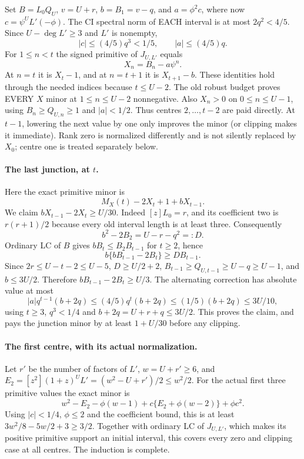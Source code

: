 Set $B=L_0Q_U$, $v=U+r$, $b=B_1=v-q$, and
$a=\phi^2c$, where now $c=\psi^UL'(-\phi)$.
The CI spectral norm of EACH interval is at most $2q^2<4/5$.
Since $U-\deg L'\ge3$ and $L'$ is nonempty,
\[
 |c|\le(4/5)q^3<1/5,\qquad |a|\le(4/5)q.
\]
For $1\le n<t$ the signed primitive of $J_{U,L'}$ equals
\[
 X_n=B_n-a\psi^n.
\]
At $n=t$ it is $X_t-1$, and at $n=t+1$ it is $X_{t+1}-b$.
These identities hold through the needed indices because $t\le U-2$.
The old robust budget proves EVERY $X$ minor at
$1\le n\le U-2$ nonnegative. Also $X_n>0$ on $0\le n\le U-1$,
using $B_n\ge Q_{U,n}\ge1$ and $|a|<1/2$.
Thus centres $2,\ldots,t-2$ are paid directly. At $t-1$, lowering
the next value by one only improves the minor (or clipping makes
it immediate). Rank zero is normalized differently and is not
silently replaced by $X_0$; centre one is treated separately below.

\paragraph{The last junction, at $t$.}
Here the exact primitive minor is
\[
 M_X(t)-2X_t+1+bX_{t-1}.
\]
We claim $bX_{t-1}-2X_t\ge U/30$.
Indeed $[z]L_0=r$, and its coefficient two is
$r(r+1)/2$ because every old interval length is at least three.
Consequently
\[
 b^2-2B_2=U-r-q^2=:D.
\]
Ordinary LC of $B$ gives
$bB_t\le B_2B_{t-1}$ for $t\ge2$, hence
\[
 b\{bB_{t-1}-2B_t\}\ge D B_{t-1}.
\]
Since $2r\le U-t-2\le U-5$,
$D\ge U/2+2$, $B_{t-1}\ge Q_{U,t-1}\ge U-q\ge U-1$,
and $b\le3U/2$. Therefore $bB_{t-1}-2B_t\ge U/3$.
The alternating correction has absolute value at most
\[
 |a|q^{t-1}(b+2q)
 \le(4/5)q^t(b+2q)\le(1/5)(b+2q)\le3U/10,
\]
using $t\ge3$, $q^3<1/4$ and $b+2q=U+r+q\le3U/2$.
This proves the claim, and pays the junction minor by at least
$1+U/30$ before any clipping.

\paragraph{The first centre, with its actual normalization.}
Let $r'$ be the number of factors of $L'$, $w=U+r'\ge6$, and
$E_2=[z^2](1+z)^UL'=(w^2-U+r')/2\le w^2/2$.
For the actual first three primitive values the exact minor is
\[
 w^2-E_2-\phi(w-1)
       +c\{E_2+\phi(w-2)\}+\phi c^2.
\]
Using $|c|<1/4$, $\phi\le2$ and the coefficient bound, this is
at least $3w^2/8-5w/2+3\ge3/2$.
Together with ordinary LC of $J_{U,L'}$, which makes its positive
primitive support an initial interval, this covers every zero and
clipping case at all centres. The induction is complete.

